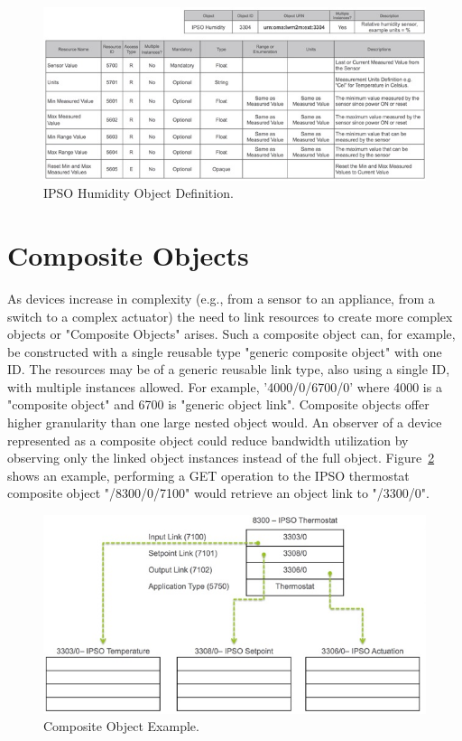 \documentclass[peerreview, a4paper, 7pt]{IEEEtran}
\begin{document}
\begin{figure}[!htbp]
 \centering
 \includegraphics[scale=0.70]{humidity-object.jpg}
 \caption{IPSO Humidity Object Definition.}
 \label{humidity-object-figure}
\end{figure}


\section{Composite Objects}

As devices increase in complexity (e.g., from a sensor to an appliance, from a switch to a complex actuator) the need to link resources to create more complex objects or "Composite Objects" arises. Such a composite object can, for example, be constructed with a single reusable type "generic composite object" with one ID. The resources may be of a generic reusable link type, also using a single ID, with multiple instances allowed. For example, '4000/0/6700/0' where 4000 is a "composite object" and 6700 is "generic object link". Composite objects offer higher granularity than one large nested object would. An observer of a device represented as a composite object could reduce bandwidth utilization by observing only the linked object instances instead of the full object. Figure~\ref{composite-object-figure} shows an example, performing a GET operation to the IPSO thermostat composite object "/8300/0/7100" would retrieve an object link to "/3300/0".


\begin{figure}[!htbp]
 \centering
 \includegraphics[scale=0.50]{composite-object.jpg}
 \caption{Composite Object Example.}
 \label{composite-object-figure}
\end{figure}
\end{document}
